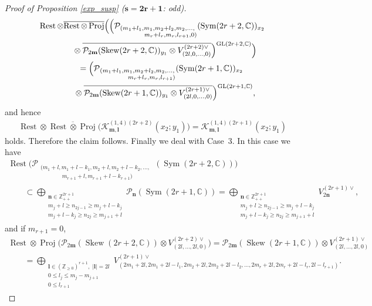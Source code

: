 \documentclass[pdftex]{sigma}
\numberwithin{equation}{section}
\newcommand{\bl}{\mathbf{l}}
\newcommand{\bm}{\mathbf{m}}
\newcommand{\bn}{\mathbf{n}}
\newcommand{\BZ}{\mathbb{Z}}
\newcommand{\BC}{\mathbb{C}}
\newcommand{\cK}{\mathcal{K}}
\newcommand{\cP}{\mathcal{P}}
\newcommand{\Proj}{\operatorname{Proj}}
\newcommand{\Sym}{\operatorname{Sym}}
\newcommand{\Skew}{\operatorname{Skew}}
\newcommand{\Rest}{\operatorname{Rest}}
\begin{document}
\begin{proof}[Proof of Proposition \ref{exp_susp} ($\boldsymbol{s=2r+1}$: odd)]
\begin{gather*}
 \Rest\otimes\overline{\Rest\otimes\Proj}\Big(\Big(
\cP_{\substack{(m_1+l_1,m_1,m_2+l_2,m_2,\ldots,\;\\\hspace{30pt} m_r+l_r,m_r,l_{r+1},0)}}(\Sym(2r+2,\BC))_{x_2}\\
\qquad\quad{} \otimes\overline{\cP_{2\bm}(\Skew(2r+2,\BC))_{y_1}
\otimes V_{(2l,0,\ldots,0)}^{(2r+2)\vee}}\Big)^{{\rm GL}(2r+2,\BC)}\Big)\\
\qquad{} =\Big(\cP_{\substack{(m_1+l_1,m_1,m_2+l_2,m_2,\ldots,\\\hspace{35pt} m_r+l_r,m_r,l_{r+1})}}(\Sym(2r+1,\BC))_{x_2}\\
\qquad\quad {} \otimes\overline{\cP_{2\bm}(\Skew(2r+1,\BC))_{y_1}
\otimes V_{(2l,0,\ldots,0)}^{(2r+1)\vee}}\Big)^{{\rm GL}(2r+1,\BC)},
\end{gather*}
and hence
\begin{gather*} \Rest\otimes\overline{\Rest\otimes\Proj} \big(\cK_{\bm,\bl}^{(1,4)(2r+2)}(x_2;y_1)\big)=\cK_{\bm,\bl}^{(1,4)(2r+1)}(x_2;y_1) \end{gather*}
holds. Therefore the claim follows. Finally we deal with Case~3. In this case we have
\begin{gather*}
 \Rest\big(\cP_{\substack{(m_1+l,m_1+l-k_1,m_2+l,m_2+l-k_2,\ldots,\;\\\hspace{45pt} m_{r+1}+l,m_{r+1}+l-k_{r+1})}}(\Sym(2r+2,\BC))\big) \\
\qquad{} \subset\bigoplus_{\substack{\bn\in\BZ_{++}^{2r+1}\\ m_j+l\ge n_{2j-1}\ge m_j+l-k_j\\ m_j+l-k_j\ge n_{2j}\ge m_{j+1}+l}}\cP_\bn(\Sym(2r+1,\BC))
=\bigoplus_{\substack{\bn\in\BZ_{++}^{2r+1}\\ m_j+l\ge n_{2j-1}\ge m_j+l-k_j\\ m_j+l-k_j\ge n_{2j}\ge m_{j+1}+l}}V_{2\bn}^{(2r+1)\vee},
\end{gather*}
and if $m_{r+1}=0$,
\begin{gather*}
 \Rest\otimes\Proj\big(\cP_{2\bm}(\Skew(2r+2,\BC))\otimes V_{(2l,\ldots,2l,0)}^{(2r+2)\vee}\big) =\cP_{2\bm}(\Skew(2r+1,\BC))\otimes V_{(2l,\ldots,2l,0)}^{(2r+1)\vee}\\
\qquad{} =\bigoplus_{\substack{\bl\in(\BZ_{\ge 0})^{r+1},\; |\bl|=2l\\ 0\le l_j\le m_j-m_{j+1}\\ 0\le l_{r+1}}}
V_{(2m_1+2l,2m_1+2l-l_1,2m_2+2l,2m_2+2l-l_2,\ldots,2m_r+2l,2m_r+2l-l_r,2l-l_{r+1})}^{(2r+1)\vee}.

\end{gather*}
\end{proof}
\end{document}

